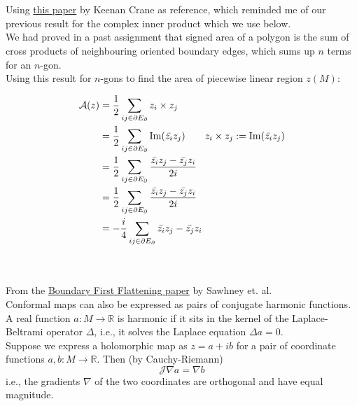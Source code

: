 \documentclass{article}
\newcommand\ifrac[2]{{\displaystyle\frac{#1}{#2}}}
\def\grad{\nabla}
\def\lap{\Delta}
\def\hal{\ifrac{1}{2}}
\def\cA{\mathcal{A}}
\def\cJ{\mathcal{J}}
\def\R{\mathbb{R}}
\def\R{\mathbb{R}}
\DeclareMathOperator{\im}{Im}
\begin{document}
\vspace{1.8cm}
\\\\


Using \href{https://www.cs.cmu.edu/~kmcrane/Projects/Other/ConformalGeometryOfSimplicialSurfaces.pdf}{this paper}
by Keenan Crane as reference, which reminded me of our previous result for the complex inner product which we use below.\\

We had proved in a past assignment that signed area of a polygon is the sum of cross products of neighbouring oriented 
boundary edges, which sums up $n$ terms for an $n$-gon.\\

Using this result for $n$-gons to find the area of piecewise linear region $z(M)$:

\begin{align*}
    \cA(z) &= \hal \sum_{ij \in \partial E_\partial} z_i \times z_j \\
        &= \hal \sum_{ij \in \partial E_\partial} \im (\bar{z_i} z_j) \tag*{$z_i \times z_j := \im (\bar{z_i} z_j)$} \\
        &= \hal \sum_{ij \in \partial E_\partial} \frac{\bar{z_i}z_j - \bar{z_j}z_i}{2i} \\
        &= \hal \sum_{ij \in \partial E_\partial} \frac{\bar{z_i}z_j - \bar{z_j}z_i}{2i} \\
        &= -\frac{i}{4} \sum_{ij \in \partial E_\partial} \bar{z_i}z_j - \bar{z_j}z_i
\end{align*}


\pagebreak
{}\\\\


From the \href{https://geometrycollective.github.io/boundary-first-flattening/}{Boundary First Flattening paper} by Sawhney et. al.\\

Conformal maps can also be expressed as pairs of conjugate harmonic functions.
A real function $a : M \rightarrow \R$ is harmonic if it sits in the kernel of the Laplace-Beltrami operator $\lap$,
i.e., it solves the Laplace equation $\lap a = 0$.\\

Suppose we express a holomorphic map as $z = a + ib$ for a pair of coordinate functions $a, b : M \rightarrow \R$.
Then (by Cauchy-Riemann)
$$\cJ \grad a = \grad b$$
i.e., the gradients $\grad$ of the two coordinates are orthogonal and have equal magnitude.\\
\end{document}
